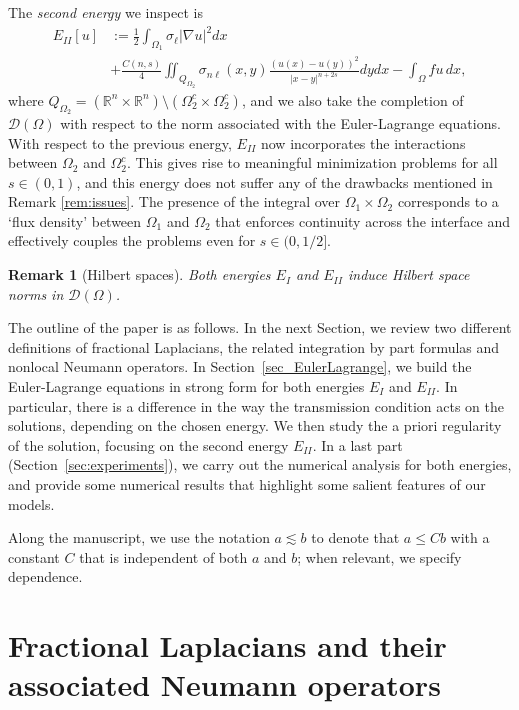 \documentclass{amsart}
\newcommand{\Ol}{\Omega_{1}}%
\newcommand{\Onl}{\Omega_{2}}%
\renewcommand{\sl}{{\sigma_\ell}}
\newcommand{\snl}{{\sigma_{n\ell}}}
\def\calD{\mathcal{D}}
\def\Om{\Omega}
\def\rn{{{\mathbb R}^n}}
\theoremstyle{plain}
\newtheorem{remark}{Remark}
\numberwithin{equation}{section}
\numberwithin{table}{section}
\numberwithin{figure}{section}
\numberwithin{theorem}{section}
\numberwithin{corollary}{section}
\numberwithin{definition}{section}
\numberwithin{lemma}{section}
\numberwithin{proposition}{section}
\numberwithin{remark}{section}
\begin{document}
The \emph{second energy} we inspect is 
\begin{equation} \label{eq:energy-III}
\begin{split}
E_{II}[u] 
& := \frac12 \int_{\Ol} \sl |\nabla u |^2 dx \\
& + \frac{C(n,s)}{4} \iint_{Q_{\Onl}} \snl(x,y) \frac{(u(x)-u(y))^2}{|x-y|^{n+2s}} dy dx - \int_\Omega f u \, dx ,  
\end{split}
\end{equation}
where $Q_{\Onl} = (\rn \times \rn) \setminus (\Onl^c \times \Onl^c)$, and we also take the completion of ${\mathcal D}(\Om)$ with respect to the norm associated with the Euler-Lagrange equations.
%
With respect to the previous energy, $E_{II}$ now incorporates the interactions between $\Onl$ and $\Onl^c$. This gives rise to meaningful minimization problems for all $s \in (0,1)$, and this energy does not suffer any of the drawbacks mentioned in Remark \ref{rem:issues}. The presence of the integral over $\Ol\times\Onl$ corresponds to a `flux density' between $\Ol$ and $\Onl$ that enforces continuity across the interface and effectively couples the problems even for $s \in (0,1/2]$.

\begin{remark}[Hilbert spaces]
Both energies $E_I$ and $E_{II}$ induce Hilbert space norms in $\calD(\Omega)$. 
\end{remark}

The outline of the paper is as follows. In the next Section, we review two different definitions of fractional Laplacians, the related integration by part formulas and nonlocal Neumann operators. In Section~\ref{sec_EulerLagrange}, we build the Euler-Lagrange equations in strong form for both energies $E_{I}$ and $E_{II}$. In particular, there is a difference in the way the transmission condition acts on the solutions, depending on the chosen energy. We then study the a priori regularity of the solution, focusing on the second energy $E_{II}$. In a last part (Section~\ref{sec:experiments}), we carry out the numerical analysis for both energies, and provide some numerical results that highlight some salient features of our models. 

Along the manuscript, we use the notation $a \lesssim b$ to denote that $a \le C b$ with a constant $C$ that is independent of both $a$ and $b$; when relevant, we specify dependence.

\section{Fractional Laplacians and their associated Neumann operators}
\end{document}
